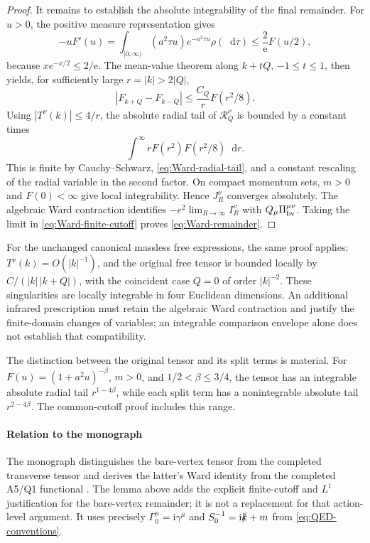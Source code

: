 \documentclass[final,5p,times,twocolumn,numbers,nopreprintline]{elsarticle}
\numberwithin{equation}{section}
\theoremstyle{definition}
\theoremstyle{remark}
\newcommand{\dd}{\mathop{}\!\mathrm d}
\newcommand{\ii}{\mathrm i}
\begin{document}
\begin{proof}
It remains to establish the absolute integrability of the final
remainder. For \(u>0\), the positive measure representation gives
\begin{equation}
 -uF'(u)
 =\int_{[0,\infty)}(a^2\tau u)e^{-a^2\tau u}\rho(\dd\tau)
 \leq\frac2{\mathrm e}F(u/2),
 \label{eq:Ward-CM-derivative}
\end{equation}
because \(x e^{-x/2}\leq2/\mathrm e\).
The mean-value theorem along \(k+tQ\), \(-1\leq t\leq1\),
then yields, for sufficiently large \(r=|k|>2|Q|\),
\[
 |F_{k+Q}-F_{k-Q}|
 \leq\frac{C_Q}{r}F(r^2/8).
\]
Using \(|T^\nu(k)|\leq4/r\), the absolute radial tail of
\(\mathcal R_Q^\nu\) is bounded by a constant times
\[
 \int^\infty rF(r^2)F(r^2/8)\dd r.
\]
This is finite by Cauchy--Schwarz, \eqref{eq:Ward-radial-tail},
and a constant rescaling of the radial variable in the second
factor. On compact momentum sets, \(m>0\) and \(F(0)<\infty\)
give local integrability. Hence \(J_R^\nu\) converges absolutely.
The algebraic Ward contraction identifies
\(-e^2\lim_{R\to\infty}I_R^\nu\) with
\(Q_\mu\Pi_{\rm bv}^{\mu\nu}\). Taking the limit in
\eqref{eq:Ward-finite-cutoff} proves
\eqref{eq:Ward-remainder}.
\end{proof}

For the unchanged canonical massless free expressions, the same
proof applies: \(T^\nu(k)=O(|k|^{-1})\), and the original free
tensor is bounded locally by
\(C/(|k|\,|k+Q|)\), with the coincident case \(Q=0\) of order
\(|k|^{-2}\). These singularities are locally integrable in four
Euclidean dimensions. An additional infrared prescription must
retain the algebraic Ward contraction and justify the finite-domain
changes of variables; an integrable comparison envelope alone
does not establish that compatibility.

The distinction between the original tensor and its split terms is
material. For \(F(u)=(1+a^2u)^{-\beta}\), \(m>0\), and
\(1/2<\beta\leq3/4\), the tensor has an integrable absolute
radial tail \(r^{1-4\beta}\), while each split term has a
nonintegrable absolute tail \(r^{2-4\beta}\).
The common-cutoff proof includes this range.

\paragraph{Relation to the monograph}
The monograph distinguishes the bare-vertex tensor from the
completed transverse tensor and derives the latter's Ward
identity from the completed A5/Q1 functional
\cite{ChiapponeMonograph}. The lemma above adds the explicit
finite-cutoff and \(L^1\) justification for the bare-vertex
remainder; it is not a replacement for that action-level argument.
It uses precisely \(\Gamma_0^\mu=\ii\gamma^\mu\) and
\(S_0^{-1}=\ii\slashed k+m\) from
\eqref{eq:QED-conventions}.
\end{document}

